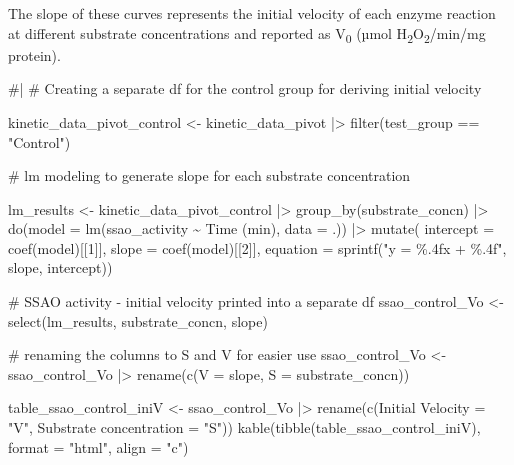 \documentclass[
  letterpaper,
  DIV=11,
  numbers=noendperiod]{scrreprt}
\newenvironment{Shaded}{\begin{snugshade}}{\end{snugshade}}
\newcommand{\AttributeTok}[1]{\textcolor[rgb]{0.40,0.45,0.13}{#1}}
\newcommand{\CommentTok}[1]{\textcolor[rgb]{0.37,0.37,0.37}{#1}}
\newcommand{\DecValTok}[1]{\textcolor[rgb]{0.68,0.00,0.00}{#1}}
\newcommand{\FunctionTok}[1]{\textcolor[rgb]{0.28,0.35,0.67}{#1}}
\newcommand{\NormalTok}[1]{\textcolor[rgb]{0.00,0.23,0.31}{#1}}
\newcommand{\OtherTok}[1]{\textcolor[rgb]{0.00,0.23,0.31}{#1}}
\newcommand{\SpecialCharTok}[1]{\textcolor[rgb]{0.37,0.37,0.37}{#1}}
\newcommand{\StringTok}[1]{\textcolor[rgb]{0.13,0.47,0.30}{#1}}
\begin{document}
The slope of these curves represents the initial velocity of each enzyme
reaction at different substrate concentrations and reported as
V\textsubscript{0} (µmol H\textsubscript{2}O\textsubscript{2}/min/mg
protein).

\begin{Shaded}
\begin{Highlighting}[]
\CommentTok{\#|}
\CommentTok{\# Creating a separate df for the control group for deriving initial velocity}

\NormalTok{kinetic\_data\_pivot\_control }\OtherTok{\textless{}{-}}\NormalTok{ kinetic\_data\_pivot }\SpecialCharTok{|\textgreater{}} \FunctionTok{filter}\NormalTok{(test\_group }\SpecialCharTok{==} \StringTok{"Control"}\NormalTok{)}


\CommentTok{\# lm modeling to generate slope for each substrate concentration}

\NormalTok{lm\_results }\OtherTok{\textless{}{-}}\NormalTok{ kinetic\_data\_pivot\_control }\SpecialCharTok{|\textgreater{}} 
  \FunctionTok{group\_by}\NormalTok{(substrate\_concn) }\SpecialCharTok{|\textgreater{}} 
  \FunctionTok{do}\NormalTok{(}\AttributeTok{model =} \FunctionTok{lm}\NormalTok{(ssao\_activity }\SpecialCharTok{\textasciitilde{}} \StringTok{\textasciigrave{}}\AttributeTok{Time (min)}\StringTok{\textasciigrave{}}\NormalTok{, }\AttributeTok{data =}\NormalTok{ .)) }\SpecialCharTok{|\textgreater{}} 
  \FunctionTok{mutate}\NormalTok{(}
  \AttributeTok{intercept =} \FunctionTok{coef}\NormalTok{(model)[[}\DecValTok{1}\NormalTok{]],}
  \AttributeTok{slope =} \FunctionTok{coef}\NormalTok{(model)[[}\DecValTok{2}\NormalTok{]],}
  \AttributeTok{equation =} \FunctionTok{sprintf}\NormalTok{(}\StringTok{"y = \%.4fx + \%.4f"}\NormalTok{, slope, intercept))}

\CommentTok{\# SSAO activity {-} initial velocity printed into a separate df}
\NormalTok{ssao\_control\_Vo }\OtherTok{\textless{}{-}} \FunctionTok{select}\NormalTok{(lm\_results, substrate\_concn, slope)}

\CommentTok{\# renaming the columns to S and V for easier use}
\NormalTok{ssao\_control\_Vo }\OtherTok{\textless{}{-}}\NormalTok{ ssao\_control\_Vo }\SpecialCharTok{|\textgreater{}} 
  \FunctionTok{rename}\NormalTok{(}\FunctionTok{c}\NormalTok{(}\StringTok{\textquotesingle{}V\textquotesingle{}} \OtherTok{=}\NormalTok{ slope, }\StringTok{\textquotesingle{}S\textquotesingle{}} \OtherTok{=}\NormalTok{ substrate\_concn))}

\NormalTok{table\_ssao\_control\_iniV }\OtherTok{\textless{}{-}}\NormalTok{ ssao\_control\_Vo }\SpecialCharTok{|\textgreater{}} 
  \FunctionTok{rename}\NormalTok{(}\FunctionTok{c}\NormalTok{(}\StringTok{\textquotesingle{}Initial Velocity\textquotesingle{}} \OtherTok{=} \StringTok{"V"}\NormalTok{, }
           \StringTok{\textquotesingle{}Substrate concentration\textquotesingle{}} \OtherTok{=} \StringTok{"S"}\NormalTok{))}
\FunctionTok{kable}\NormalTok{(}\FunctionTok{tibble}\NormalTok{(table\_ssao\_control\_iniV), }\AttributeTok{format =} \StringTok{"html"}\NormalTok{, }\AttributeTok{align =} \StringTok{"c"}\NormalTok{)}
\end{Highlighting}
\end{Shaded}
\end{document}
